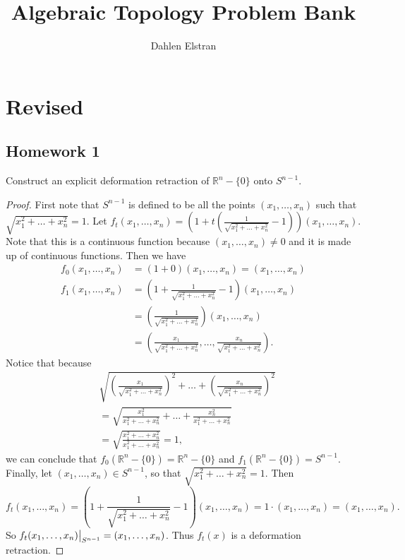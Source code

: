 \documentclass[12pt]{article}
\newenvironment{statement}[2][Statement]{\begin{trivlist}
\item[\hskip \labelsep {\bfseries #1}\hskip \labelsep {\bfseries #2.}]}{\end{trivlist}}
\newcommand{\littletaller}{\vphantom{\big|}}
\newcommand\restr[2]{{%
  \left.\kern-\nulldelimiterspace %
  #1 %
  \littletaller %
  \right|_{#2} %
  }}
\begin{document}
 
\title{Algebraic Topology Problem Bank} 
\author{Dahlen Elstran} 
\maketitle

\section{Revised}

\subsection{Homework 1}

\begin{statement}[Exercise]{0.2}
    Construct an explicit deformation retraction of $\mathbb{R}^n - \{0\}$ onto $S^{n-1}$.
\end{statement}
\begin{proof}
    First note that $S^{n-1}$ is defined to be all the points $(x_1, \dots, x_n)$ such that \\
    $\sqrt{x_1^2+ \dots + x_n^2}=1$. 
    Let $f_t(x_1, \dots , x_n)=(1+t(\frac{1}{\sqrt{x_1^2 + \dots + x_n^2}} - 1))(x_1, \dots, x_n)$. 
    Note that this is a continuous function because $(x_1, \dots, x_n) \neq 0$ and it is made up of 
    continuous functions. Then we have
    \begin{align*}
        f_0(x_1, \dots, x_n) &= (1+0)(x_1, \dots, x_n) = (x_1, \dots, x_n) \\
        f_1(x_1, \dots, x_n) &= (1 + \frac{1}{\sqrt{x_1^2 + \dots + x_n^2}} -1)(x_1, \dots, x_n) \\
        &= (\frac{1}{\sqrt{x_1^2 + \dots + x_n^2}})(x_1, \dots, x_n) \\
        &= (\frac{x_1}{\sqrt{x_1^2 + \dots + x_n^2}}, \dots, \frac{x_n}{\sqrt{x_1^2 + \dots + x_n^2}}).
    \end{align*}
    Notice that because 
    \begin{align*}
        & \sqrt{(\frac{x_1}{\sqrt{x_1^2 + \dots + x_n^2}})^2+ \dots + (\frac{x_n}{\sqrt{x_1^2 + \dots + x_n^2}})^2} \\
        & = \sqrt{\frac{x_1^2}{x_1^2 + \dots + x_n^2} + \dots + \frac{x_n^2}{x_1^2 + \dots + x_n^2}} \\
        & = \sqrt{\frac{x_1^2 + \dots + x_n^2}{x_1^2 + \dots + x_n^2}} = 1,
    \end{align*}
    we can conclude that $f_0(\mathbb{R}^n - \{0\})=\mathbb{R}^n - \{0\}$ and $f_1(\mathbb{R}^n - \{0\})=S^{n-1}$.
    Finally, let $(x_1, \dots, x_n) \in S^{n-1}$, so that $\sqrt{x_1^2+ \dots + x_n^2}=1$. Then 
    \begin{equation*}
        f_t(x_1, \dots, x_n)=(1+\frac{1}{\sqrt{x_1^2 + \dots + x_n^2}} - 1)(x_1, \dots, x_n) = 1 \cdot (x_1, \dots, x_n) =  (x_1, \dots, x_n).
    \end{equation*}
    So $\restr{f_t(x_1, \dots, x_n)}{S^{n-1}} = (x_1, \dots, x_n)$. Thus $f_t(x)$ is a deformation retraction.
\end{proof}
\end{document}
